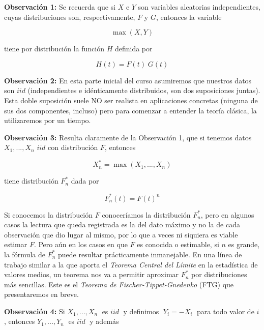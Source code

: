 \documentclass[
]{book}
\theoremstyle{definition}
\theoremstyle{definition}
\theoremstyle{definition}
\theoremstyle{definition}
\theoremstyle{remark}
\begin{document}
\textbf{Observación 1:} Se recuerda que si \(X\) e \(Y\) son variables aleatorias independientes, cuyas
distribuciones son, respectivamente, \(F\) y \(G\),
entonces la variable

\begin{equation}
\max \left( X,Y \right)
\label{eq:1}
\end{equation}

tiene por distribución la función \(H\) definida por

\begin{equation}
H(t)= F(t)\; G(t)
\label{eq:2}
\end{equation}

\textbf{Observación 2:} En esta parte inicial del curso
asumiremos que nuestros datos son \(iid\)
(independientes e idénticamente distribuidos, son
dos suposiciones juntas). Esta doble suposición
suele NO ser realista en aplicaciones concretas
(ninguna de sus dos componentes, incluso) pero
para comenzar a entender la teoría clásica, la
utilizaremos por un tiempo.

\textbf{Observación 3:} Resulta claramente de la
Observación 1, que si tenemos datos \(X_1,...,X_n\) \(iid\) con distribución \(F\), entonces

\begin{equation}
X_n^{\ast}= \max \left( X_1,...,X_n \right)
\end{equation}

tiene distribución \(F_n^\ast\) dada por

\begin{equation}
F_n^\ast (t) = F(t)^n
\end{equation}

Si conocemos la distribución \(F\) conoceríamos la
distribución \(F_n^\ast\), pero en algunos casos la lectura
que queda registrada es la del dato máximo y no la
de cada observación que dio lugar al mismo, por lo
que a veces ni siquiera es viable estimar \(F\).
Pero aún en los casos en que \(F\) es conocida o
estimable, si \(n\) es grande, la fórmula de \(F_n^\ast\) puede resultar prácticamente inmanejable. En una línea de trabajo similar a la que aporta el \emph{Teorema
Central del Límite} en la estadística de valores
medios, un teorema nos va a permitir aproximar
\(F_n^\ast\) por distribuciones más sencillas. Este es el
\emph{Teorema de Fischer-Tippet-Gnedenko} (FTG) que presentaremos en breve.

\textbf{Observación 4:} Si \(X_1,...,X_n\;\) es \(iid\;\) y definimos
\(\;Y_i = -X_i\;\) para todo valor de \(i\), entonces \(Y_1,...,Y_n\;\) es \(iid\;\) y además
\end{document}
